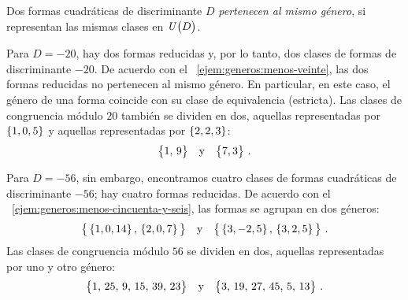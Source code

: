 \begin{defGeneros}\label{def:generos}
	Dos formas cuadr\'aticas %
	de discriminante $D$ \emph{pertenecen al mismo g\'enero},
	si representan las mismas clases
	en $\Unidadesmod[D]$.
\end{defGeneros}

\begin{ejemGeneros}\label{ejem:generos}
	Para $D=-20$, hay dos formas reducidas y, por lo tanto, dos
	clases de formas de discriminante $-20$. De acuerdo con el
	\ejemname~\ref{ejem:generos:menos-veinte},
	las dos formas reducidas no pertenecen al mismo g\'enero.
	En particular, en este caso, el g\'enero de una forma coincide
	con su clase de equivalencia (estricta).
	Las clases de congruencia m\'odulo $20$ tambi\'en se dividen
	en dos, aquellas representadas por $\binaria{1,0,5}$ y aquellas
	representadas por $\binaria{2,2,3}$:
	\begin{displaymath}
		\big\{1,\,9\big\}\dispand
		\big\{7,3\big\}
		\dispstop
	\end{displaymath}

	Para $D=-56$, sin embargo, encontramos cuatro clases de formas
	cuadr\'aticas de discriminante $-56$;
	hay cuatro formas reducidas. De acuerdo con el
	\ejemname~\ref{ejem:generos:menos-cincuenta-y-seis},
	las formas se agrupan en dos g\'eneros:
	\begin{displaymath}
		\big\{
			\binaria{1,0,14},\,
			\binaria{2,0,7}
		\big\}\dispand
		\big\{
			\binaria{3,-2,5},\,
			\binaria{3,2,5}
		\big\}
		\dispstop
	\end{displaymath}
	Las clases de congruencia m\'odulo $56$ se dividen en dos,
	aquellas representadas por uno y otro g\'enero:
	\begin{displaymath}
		\big\{1,\,25,\,9,\,15,\,39,\,23\big\}\dispand
		\big\{3,\,19,\,27,\,45,\,5,\,13\big\}
		\dispstop
	\end{displaymath}
\end{ejemGeneros}

